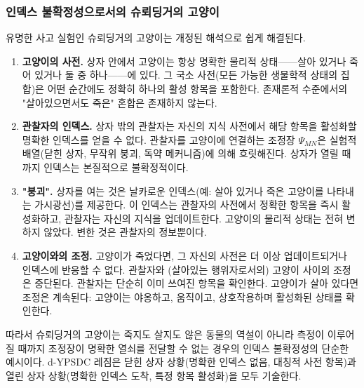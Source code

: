 \documentclass[12pt,a4paper]{article}
\begin{document}
	\medskip
	
	\subsubsection{인덱스 불확정성으로서의 슈뢰딩거의 고양이}
	
	유명한 사고 실험인 슈뢰딩거의 고양이는 개정된 해석으로 쉽게 해결된다.
	
	\begin{enumerate}[leftmargin=*]
		\item \textbf{고양이의 사전.} 상자 안에서 고양이는 항상 명확한 물리적 상태——살아 있거나 죽어 있거나 둘 중 하나——에 있다. 그 국소 사전(모든 가능한 생물학적 상태의 집합)은 어떤 순간에도 정확히 하나의 활성 항목을 포함한다. 존재론적 수준에서의 "살아있으면서도 죽은" 혼합은 존재하지 않는다.
		
		\item \textbf{관찰자의 인덱스.} 상자 밖의 관찰자는 자신의 지식 사전에서 해당 항목을 활성화할 명확한 인덱스를 얻을 수 없다. 관찰자를 고양이에 연결하는 조정장 $\Psi_{MN}$은 실험적 배열(닫힌 상자, 무작위 붕괴, 독약 메커니즘)에 의해 흐릿해진다. 상자가 열릴 때까지 인덱스는 본질적으로 불확정적이다.
		
		\item \textbf{"붕괴".} 상자를 여는 것은 날카로운 인덱스(예: 살아 있거나 죽은 고양이를 나타내는 가시광선)를 제공한다. 이 인덱스는 관찰자의 사전에서 정확한 항목을 즉시 활성화하고, 관찰자는 자신의 지식을 업데이트한다. 고양이의 물리적 상태는 전혀 변하지 않았다. 변한 것은 관찰자의 정보뿐이다.
		
		\item \textbf{고양이와의 조정.} 고양이가 죽었다면, 그 자신의 사전은 더 이상 업데이트되거나 인덱스에 반응할 수 없다. 관찰자와 (살아있는 행위자로서의) 고양이 사이의 조정은 중단된다. 관찰자는 단순히 이미 쓰여진 항목을 확인한다. 고양이가 살아 있다면 조정은 계속된다: 고양이는 야옹하고, 움직이고, 상호작용하며 활성화된 상태를 확인한다.
	\end{enumerate}
	
	따라서 슈뢰딩거의 고양이는 죽지도 살지도 않은 동물의 역설이 아니라 측정이 이루어질 때까지 조정장이 명확한 열쇠를 전달할 수 없는 경우의 인덱스 불확정성의 단순한 예시이다. d-YPSDC 레짐은 닫힌 상자 상황(명확한 인덱스 없음, 대칭적 사전 항목)과 열린 상자 상황(명확한 인덱스 도착, 특정 항목 활성화)을 모두 기술한다.
	
\end{document}
